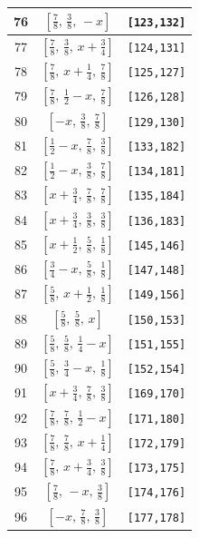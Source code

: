 \documentclass[fleqn,8pt]{jsarticle}
\begin{document}
\begin{longtable}{ccc}
76 & $\left[ \frac{7}{8},\, \frac{3}{8},\, - x \right]$ & {\tt [123,132]} \\ \hline
77 & $\left[ \frac{7}{8},\, \frac{3}{8},\, x + \frac{3}{4} \right]$ & {\tt [124,131]} \\ \hline
78 & $\left[ \frac{7}{8},\, x + \frac{1}{4},\, \frac{7}{8} \right]$ & {\tt [125,127]} \\ \hline
79 & $\left[ \frac{7}{8},\, \frac{1}{2} - x,\, \frac{7}{8} \right]$ & {\tt [126,128]} \\ \hline
80 & $\left[ - x,\, \frac{3}{8},\, \frac{7}{8} \right]$ & {\tt [129,130]} \\ \hline
81 & $\left[ \frac{1}{2} - x,\, \frac{7}{8},\, \frac{3}{8} \right]$ & {\tt [133,182]} \\ \hline
82 & $\left[ \frac{1}{2} - x,\, \frac{3}{8},\, \frac{7}{8} \right]$ & {\tt [134,181]} \\ \hline
83 & $\left[ x + \frac{3}{4},\, \frac{7}{8},\, \frac{7}{8} \right]$ & {\tt [135,184]} \\ \hline
84 & $\left[ x + \frac{3}{4},\, \frac{3}{8},\, \frac{3}{8} \right]$ & {\tt [136,183]} \\ \hline
85 & $\left[ x + \frac{1}{2},\, \frac{5}{8},\, \frac{1}{8} \right]$ & {\tt [145,146]} \\ \hline
86 & $\left[ \frac{3}{4} - x,\, \frac{5}{8},\, \frac{1}{8} \right]$ & {\tt [147,148]} \\ \hline
87 & $\left[ \frac{5}{8},\, x + \frac{1}{2},\, \frac{1}{8} \right]$ & {\tt [149,156]} \\ \hline
88 & $\left[ \frac{5}{8},\, \frac{5}{8},\, x \right]$ & {\tt [150,153]} \\ \hline
89 & $\left[ \frac{5}{8},\, \frac{5}{8},\, \frac{1}{4} - x \right]$ & {\tt [151,155]} \\ \hline
90 & $\left[ \frac{5}{8},\, \frac{3}{4} - x,\, \frac{1}{8} \right]$ & {\tt [152,154]} \\ \hline
91 & $\left[ x + \frac{3}{4},\, \frac{7}{8},\, \frac{3}{8} \right]$ & {\tt [169,170]} \\ \hline
92 & $\left[ \frac{7}{8},\, \frac{7}{8},\, \frac{1}{2} - x \right]$ & {\tt [171,180]} \\ \hline
93 & $\left[ \frac{7}{8},\, \frac{7}{8},\, x + \frac{1}{4} \right]$ & {\tt [172,179]} \\ \hline
94 & $\left[ \frac{7}{8},\, x + \frac{3}{4},\, \frac{3}{8} \right]$ & {\tt [173,175]} \\ \hline
95 & $\left[ \frac{7}{8},\, - x,\, \frac{3}{8} \right]$ & {\tt [174,176]} \\ \hline
96 & $\left[ - x,\, \frac{7}{8},\, \frac{3}{8} \right]$ & {\tt [177,178]} \\
\end{longtable}
\end{document}
